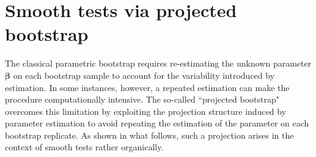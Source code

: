 \documentclass[11pt]{article}
\newcommand{\vect}[1]{\boldsymbol{#1}}
\begin{document}
\section{Smooth tests via projected bootstrap} \label{sec:3}
The classical parametric bootstrap requires re-estimating the unknown parameter $\vect{\beta}$ on each bootstrap sample to account for the variability introduced by estimation. In some instances, however, a repeated estimation can make the procedure computationally intensive. The so-called ``projected bootstrap" \citep{algeri2022k,sara2024} overcomes this limitation by exploiting the projection structure induced by parameter estimation 
 to avoid repeating the estimation of the parameter on each bootstrap replicate. As shown in what follows, such a projection arises in the context of smooth tests rather organically. 
\end{document}
